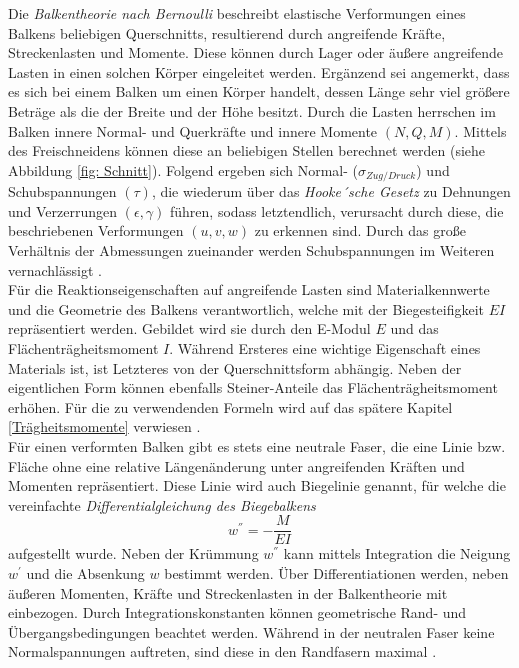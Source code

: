 \noindent Die \textit{Balkentheorie nach Bernoulli} beschreibt elastische Verformungen eines Balkens beliebigen Querschnitts, resultierend durch angreifende Kräfte, Streckenlasten und Momente. Diese können durch Lager oder äußere angreifende Lasten in einen solchen Körper eingeleitet werden. Ergänzend sei angemerkt, dass es sich bei einem Balken um einen Körper handelt, dessen Länge sehr viel größere Beträge als die der Breite und der Höhe besitzt. Durch die Lasten herrschen im Balken innere Normal- und Querkräfte und innere Momente $(N, Q, M)$. Mittels des Freischneidens können diese an beliebigen Stellen berechnet werden (siehe Abbildung \ref{fig: Schnitt}). Folgend ergeben sich Normal- ($\sigma_{Zug/Druck}$) und Schubspannungen $(\tau)$, die wiederum über das \textit{Hooke´sche Gesetz} zu Dehnungen und Verzerrungen $(\epsilon, \gamma)$ führen, sodass letztendlich, verursacht durch diese, die beschriebenen Verformungen $(u, v, w)$ zu erkennen sind. Durch das große Verhältnis der Abmessungen zueinander werden Schubspannungen im Weiteren vernachlässigt \cite{item15}\cite{item16}\cite{item9}. \\

\noindent Für die Reaktionseigenschaften auf angreifende Lasten sind Materialkennwerte und die Geometrie des Balkens verantwortlich, welche mit der Biegesteifigkeit $EI$ repräsentiert werden. Gebildet wird sie durch den E-Modul $E$ und das Flächenträgheitsmoment $I$. Während Ersteres eine wichtige Eigenschaft eines Materials ist, ist Letzteres von der Querschnittsform abhängig. Neben der eigentlichen Form können ebenfalls Steiner-Anteile das Flächenträgheitsmoment erhöhen. Für die zu verwendenden Formeln wird auf das spätere Kapitel \ref{Trägheitsmomente} verwiesen \cite{item16}.\\


\noindent Für einen verformten Balken gibt es stets eine neutrale Faser, die eine Linie bzw. Fläche ohne eine relative Längenänderung unter angreifenden Kräften und Momenten repräsentiert. Diese Linie wird auch Biegelinie genannt, für welche die vereinfachte \textit{Differentialgleichung des Biegebalkens}
\begin{equation}
	w^{''}=-\frac{M}{EI}
\end{equation}
aufgestellt wurde. Neben der Krümmung $w^{''}$ kann mittels Integration die Neigung $w^{'}$ und die Absenkung $w$ bestimmt werden. Über Differentiationen werden, neben äußeren Momenten, Kräfte und Streckenlasten in der Balkentheorie mit einbezogen. Durch Integrationskonstanten können geometrische Rand- und Übergangsbedingungen beachtet werden. Während in der neutralen Faser keine Normalspannungen auftreten, sind diese in den Randfasern maximal \cite{item16}\cite{item9}.\\

